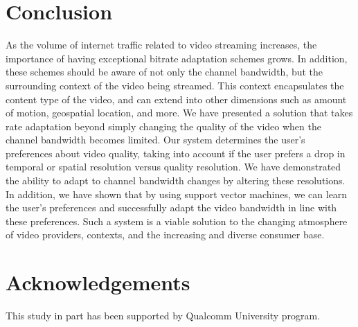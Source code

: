 \documentclass[3p,times,procedia]{elsarticle}
\begin{document}
\section{Conclusion}
\label{sec:Conclusion}
As the volume of internet traffic related to video streaming increases, the importance of having exceptional bitrate adaptation schemes grows. In addition, these schemes should be aware of not only the channel bandwidth, but the surrounding context of the video being streamed. This context encapsulates the content type of the video, and can extend into other dimensions such as amount of motion, geospatial location, and more. We have presented a solution that takes rate adaptation beyond simply changing the quality of the video when the channel bandwidth becomes limited. Our system determines the user’s preferences about video quality, taking into account if the user prefers a drop in temporal or spatial resolution versus quality resolution. We have demonstrated the ability to adapt to channel bandwidth changes by altering these resolutions. In addition, we have shown that by using support vector machines, we can learn the user’s preferences and successfully adapt the video bandwidth in line with these preferences. Such a system is a viable solution to the changing atmosphere of video providers, contexts, and the increasing and diverse consumer base.

\section*{Acknowledgements}
This study in part has been supported by Qualcomm University program. 














\end{document}
